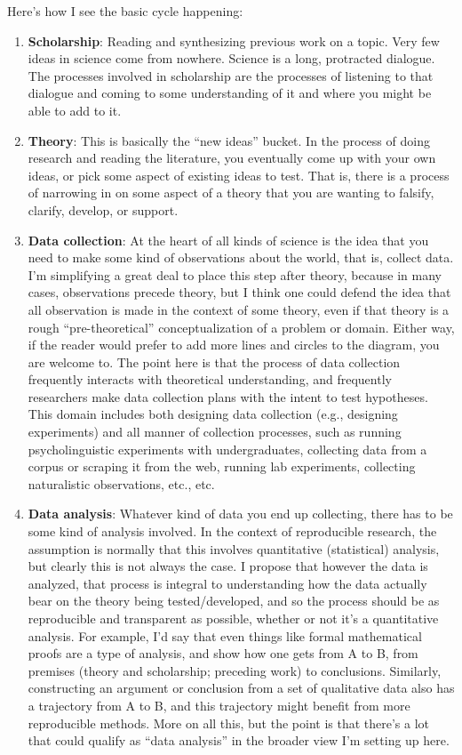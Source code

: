 \documentclass{book}
\begin{document}
\noindent Here's how I see the basic cycle happening:

\begin{enumerate}
\item \textbf{Scholarship}: Reading and synthesizing previous work on a topic. Very few ideas in science come from nowhere.  Science is a long, protracted dialogue.  The processes involved in scholarship are the processes of listening to that dialogue and coming to some understanding of it and where you might be able to add to it.
\item \textbf{Theory}: This is basically the ``new ideas'' bucket. In the process of doing research and reading the literature, you eventually come up with your own ideas, or pick some aspect of existing ideas to test. That is, there is a process of narrowing in on some aspect of a theory that you are wanting to falsify, clarify, develop, or support.
\item \textbf{Data collection}: At the heart of all kinds of science is the idea that you need to make some kind of observations about the world, that is, collect data. I'm simplifying a great deal to place this step after theory, because in many cases, observations precede theory, but I think one could defend the idea that all observation is made in the context of some theory, even if that theory is a rough ``pre-theoretical'' conceptualization of a problem or domain.  Either way, if the reader would prefer to add more lines and circles to the diagram, you are welcome to. The point here is that the process of data collection frequently interacts with theoretical understanding, and frequently researchers make data collection plans with the intent to test hypotheses.  This domain includes both designing data collection (e.g., designing experiments) and all manner of collection processes, such as running psycholinguistic experiments with undergraduates, collecting data from a corpus or scraping it from the web, running lab experiments, collecting naturalistic observations, etc., etc.
\item \textbf{Data analysis}: Whatever kind of data you end up collecting, there has to be some kind of analysis involved. In the context of reproducible research, the assumption is normally that this involves quantitative (statistical) analysis, but clearly this is not always the case. I propose that however the data is analyzed, that process is integral to understanding how the data actually bear on the theory being tested/developed, and so the process should be as reproducible and transparent as possible, whether or not it's a quantitative analysis. For example, I'd say that even things like formal mathematical proofs are a type of analysis, and show how one gets from A to B, from premises (theory and scholarship; preceding work) to conclusions. Similarly, constructing an argument or conclusion from a set of qualitative data also has a trajectory from A to B, and this trajectory might benefit from more reproducible methods. More on all this, but the point is that there's a lot that could qualify as ``data analysis'' in the broader view I'm setting up here.

\end{enumerate}
\end{document}
